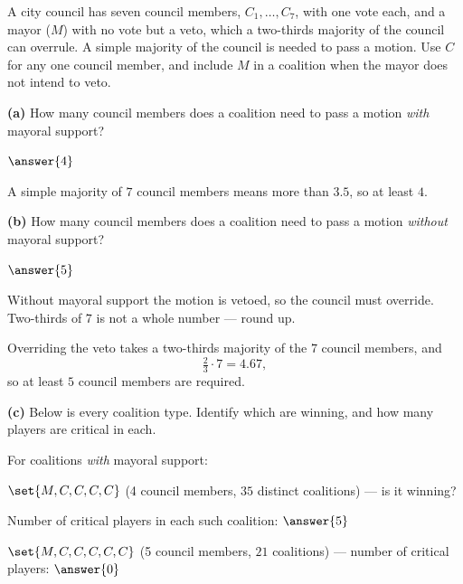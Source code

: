 \documentclass[12pt]{ximera}
\begin{document}
\begin{problem}
A city council has seven council members, $C_1,\ldots,C_7$, with one vote each, and a
mayor ($M$) with no vote but a veto, which a two-thirds majority of the council can
overrule. A simple majority of the council is needed to pass a motion. Use $C$ for any
one council member, and include $M$ in a coalition when the mayor does not intend to
veto.

\begin{prompt}
\textbf{(a)} How many council members does a coalition need to pass a motion
\emph{with} mayoral support?

$\answer{4}$

\begin{feedback}
A simple majority of $7$ council members means more than $3.5$, so at least $4$.
\end{feedback}
\end{prompt}

\begin{prompt}
\textbf{(b)} How many council members does a coalition need to pass a motion
\emph{without} mayoral support?

$\answer{5}$

\begin{hint}
Without mayoral support the motion is vetoed, so the council must override. Two-thirds
of $7$ is not a whole number --- round up.
\end{hint}

\begin{feedback}
Overriding the veto takes a two-thirds majority of the $7$ council members, and
\[ \tfrac23 \cdot 7 = 4.67, \]
so at least $5$ council members are required.
\end{feedback}
\end{prompt}

\begin{prompt}
\textbf{(c)} Below is every coalition type. Identify which are winning, and how many
players are critical in each.

For coalitions \emph{with} mayoral support:

$\set{M, C, C, C, C}$ (4 council members, $35$ distinct coalitions) --- is it winning?
\begin{multipleChoice}
\end{multipleChoice}
Number of critical players in each such coalition: $\answer{5}$

\smallskip
$\set{M, C, C, C, C, C}$ (5 council members, $21$ coalitions) --- number of critical
players: $\answer{0}$


\end{prompt}
\end{problem}
\end{document}
